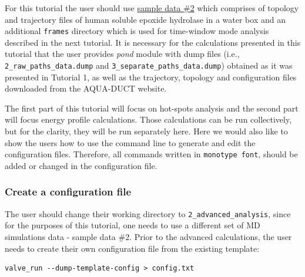\documentclass[9pt,tutorial, pubversion]{livecoms}
\begin{document}
For this tutorial the user should use \href{http://www.aquaduct.pl/sample-data/}{sample data \#2} which comprises of topology and trajectory files of human soluble epoxide hydrolase in a water box and an additional \texttt{frames} directory which is used for time-window mode analysis described in the next tutorial. It is necessary for the calculations presented in this tutorial that the user provides \textit{pond} module with dump files (i.e., \texttt{2\_raw\_paths\_data.dump} and \texttt{3\_separate\_paths\_data.dump}) obtained as it was presented in Tutorial 1, as well as the trajectory, topology and configuration files downloaded from the AQUA-DUCT website.

The first part of this tutorial will focus on hot-spots analysis and the second part will focus energy profile calculations. Those calculations can be run collectively, but for the clarity, they will be run separately here. Here we would also like to show the users how to use the command line to generate and edit the configuration files. Therefore, all commands written in \texttt{monotype font}, should be added or changed in the configuration file.

\subsubsection{Create a configuration file}
The user should change their working directory to \texttt{2\_advanced\_analysis}, since for the purposes of this tutorial, one needs to use a different set of MD simulations data - sample data \#2. Prior to the advanced calculations, the user needs to create their own configuration file from the existing template:
\begin{lstlisting}
valve_run --dump-template-config > config.txt
\end{lstlisting}
\end{document}
